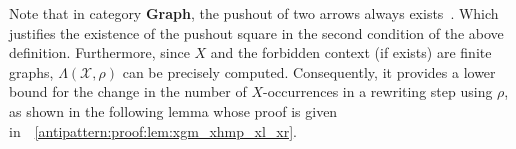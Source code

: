 Note that in category \textbf{Graph}, the pushout of two arrows always exists~\cite[p.188]{corradini1997algebraic}. Which justifies the existence of the pushout square in the second condition of the above definition.
Furthermore, since $X$ and the forbidden context (if exists) are finite graphs, $\Lambda(\mathcal{X},\rho)$ can be precisely computed. Consequently, it provides a lower bound for the change in the number of $X$-occurrences in a rewriting step using $\rho$, as shown in the following lemma whose proof is given in~\textsection~\ref{antipattern:proof:lem:xgm_xhmp_xl_xr}.

